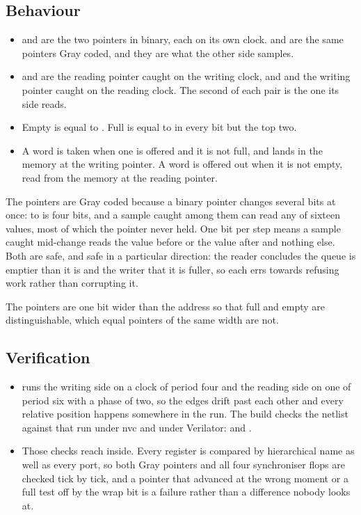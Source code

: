 
\subsection*{Behaviour}

\begin{itemize}
\item {} and  are the two pointers in binary, each
on its own clock.  and  are the same pointers
Gray coded, and they are what the other side samples.
\item {} and  are the reading pointer
caught on the writing clock, and  and 
the writing pointer caught on the reading clock. The second of each
pair is the one its side reads.
\item Empty is  equal to . Full is
 equal to  in every bit but the top two.
\item A word is taken when one is offered and it is not full, and
lands in the memory at the writing pointer. A word is offered out
when it is not empty, read from the memory at the reading pointer.
\end{itemize}

The pointers are Gray coded because a binary pointer changes several
bits at once:  to  is four bits, and a sample
caught among them can read any of sixteen values, most of which the
pointer never held. One bit per step means a sample caught mid-change
reads the value before or the value after and nothing else. Both are
safe, and safe in a particular direction: the reader concludes the
queue is emptier than it is and the writer that it is fuller, so each
errs towards refusing work rather than corrupting it.

The pointers are one bit wider than the address so that full and empty
are distinguishable, which equal pointers of the same width are not.

\subsection*{Verification}

\begin{itemize}
\item {} runs the writing side on a clock of period four
and the reading side on one of period six with a phase of two, so the
edges drift past each other and every relative position happens
somewhere in the run. The build checks the netlist against that run
under nvc and under Verilator:
 and
.
\item Those checks reach inside. Every register is compared by
hierarchical name as well as every port, so both Gray pointers and all
four synchroniser flops are checked tick by tick, and a pointer that
advanced at the wrong moment or a full test off by the wrap bit is a
failure rather than a difference nobody looks at.
\end{itemize}

